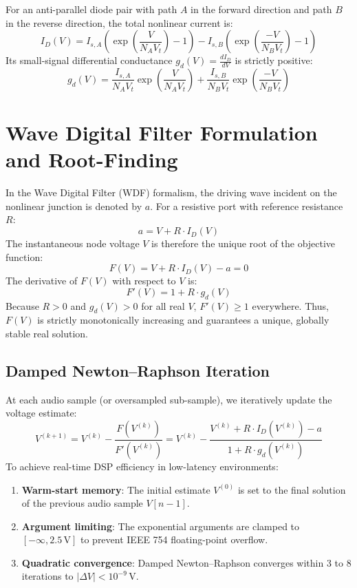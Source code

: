 \documentclass[11pt,a4paper]{article}
\begin{document}
For an anti-parallel diode pair with path $A$ in the forward direction and path $B$ in the reverse direction, the total nonlinear current is:
\begin{equation}
    I_D(V) = I_{s,A} \left( \exp\left( \frac{V}{N_A V_t} \right) - 1 \right) - I_{s,B} \left( \exp\left( \frac{-V}{N_B V_t} \right) - 1 \right)
\end{equation}
Its small-signal differential conductance $g_d(V) = \frac{d I_D}{d V}$ is strictly positive:
\begin{equation}
    g_d(V) = \frac{I_{s,A}}{N_A V_t} \exp\left( \frac{V}{N_A V_t} \right) + \frac{I_{s,B}}{N_B V_t} \exp\left( \frac{-V}{N_B V_t} \right)
\end{equation}

\section{Wave Digital Filter Formulation and Root-Finding}
In the Wave Digital Filter (WDF) formalism, the driving wave incident on the nonlinear junction is denoted by $a$. For a resistive port with reference resistance $R$:
\begin{equation}
    a = V + R \cdot I_D(V)
\end{equation}
The instantaneous node voltage $V$ is therefore the unique root of the objective function:
\begin{equation}
    F(V) = V + R \cdot I_D(V) - a = 0
\end{equation}
The derivative of $F(V)$ with respect to $V$ is:
\begin{equation}
    F'(V) = 1 + R \cdot g_d(V)
\end{equation}
Because $R > 0$ and $g_d(V) > 0$ for all real $V$, $F'(V) \ge 1$ everywhere. Thus, $F(V)$ is strictly monotonically increasing and guarantees a unique, globally stable real solution.

\subsection{Damped Newton--Raphson Iteration}
At each audio sample (or oversampled sub-sample), we iteratively update the voltage estimate:
\begin{equation}
    V^{(k+1)} = V^{(k)} - \frac{F(V^{(k)})}{F'(V^{(k)})} = V^{(k)} - \frac{V^{(k)} + R \cdot I_D(V^{(k)}) - a}{1 + R \cdot g_d(V^{(k)})}
\end{equation}
To achieve real-time DSP efficiency in low-latency environments:
\begin{enumerate}
    \item \textbf{Warm-start memory}: The initial estimate $V^{(0)}$ is set to the final solution of the previous audio sample $V[n-1]$.
    \item \textbf{Argument limiting}: The exponential arguments are clamped to $[- \infty, 2.5\,\text{V}]$ to prevent IEEE 754 floating-point overflow.
    \item \textbf{Quadratic convergence}: Damped Newton--Raphson converges within 3 to 8 iterations to $|\Delta V| < 10^{-9}\,\text{V}$.
\end{enumerate}
\end{document}
